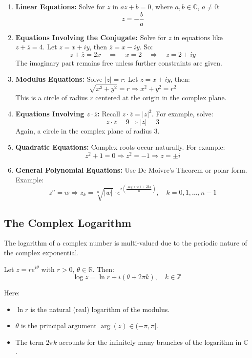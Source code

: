 \begin{enumerate}
  \item \textbf{Linear Equations:}  
  Solve for \( z \) in \( az + b = 0 \), where \( a, b \in \mathbb{C} \), \( a \neq 0 \):
  \[
  z = -\frac{b}{a}
  \]

  \item \textbf{Equations Involving the Conjugate:}  
  Solve for \( z \) in equations like \( z + \overline{z} = 4 \).  
  Let \( z = x + iy \), then \( \overline{z} = x - iy \). So:
  \[
  z + \overline{z} = 2x \quad \Rightarrow \quad x = 2 \quad \Rightarrow \quad z = 2 + iy
  \]
  The imaginary part remains free unless further constraints are given.

  \item \textbf{Modulus Equations:}  
  Solve \( |z| = r \):  
  Let \( z = x + iy \), then:
  \[
  \sqrt{x^2 + y^2} = r \Rightarrow x^2 + y^2 = r^2
  \]
  This is a circle of radius \( r \) centered at the origin in the complex plane.

  \item \textbf{Equations Involving \( z \cdot \overline{z} \):}  
  Recall \( z \cdot \overline{z} = |z|^2 \).  
  For example, solve:
  \[
  z \cdot \overline{z} = 9 \Rightarrow |z| = 3
  \]
  Again, a circle in the complex plane of radius 3.

  \item \textbf{Quadratic Equations:}  
  Complex roots occur naturally. For example:
  \[
  z^2 + 1 = 0 \Rightarrow z^2 = -1 \Rightarrow z = \pm i
  \]

  \item \textbf{General Polynomial Equations:}  
  Use De Moivre’s Theorem or polar form. Example:
  \[
  z^n = w \Rightarrow z_k = \sqrt[n]{|w|} \cdot e^{i\left( \frac{\arg(w) + 2k\pi}{n} \right)}, \quad k = 0, 1, \dots, n-1
  \]
\end{enumerate}

\subsection{The Complex Logarithm}

The logarithm of a complex number is multi-valued due to the periodic nature of the complex exponential.

Let \( z = re^{i\theta} \) with \( r > 0 \), \( \theta \in \mathbb{R} \). Then:
\[
\log z = \ln r + i(\theta + 2\pi k), \quad k \in \mathbb{Z}
\]

Here:
\begin{itemize}
  \item \( \ln r \) is the natural (real) logarithm of the modulus.
  \item \( \theta \) is the principal argument \( \arg(z) \in (-\pi, \pi] \).
  \item The term \( 2\pi k \) accounts for the infinitely many branches of the logarithm in \( \mathbb{C} \).
\end{itemize}

